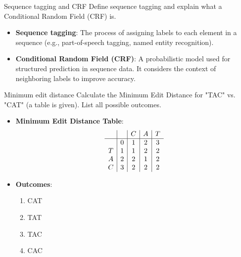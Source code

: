 \documentclass{article}
\begin{document}
\begin{exercise}{Sequence tagging and CRF}
  Define sequence tagging and explain what a Conditional Random Field (CRF) is.

  \begin{solution}
    \begin{itemize}
        \item \textbf{Sequence tagging}: The process of assigning labels to each element in a sequence (e.g., part-of-speech tagging, named entity recognition).
        \item \textbf{Conditional Random Field (CRF)}: A probabilistic model used for structured prediction in sequence data. It considers the context of neighboring labels to improve accuracy.
    \end{itemize}
  \end{solution}
\end{exercise}

\begin{exercise}{Minimum edit distance}
  Calculate the Minimum Edit Distance for "TAC" vs. "CAT" (a table is given). List all possible outcomes.

  \begin{solution}
    \begin{itemize}
        \item \textbf{Minimum Edit Distance Table}:
        \[
        \begin{array}{c|c|c|c|c}
            &  & C & A & T \\
            \hline
            & 0 & 1 & 2 & 3 \\
            T & 1 & 1 & 2 & 2 \\
            A & 2 & 2 & 1 & 2 \\
            C & 3 & 2 & 2 & 2 \\
        \end{array}
        \]
        \item \textbf{Outcomes}:
        \begin{enumerate}
            \item CAT
            \item TAT
            \item TAC
            \item CAC
        \end{enumerate}
    \end{itemize}
  \end{solution}
\end{exercise}
\end{document}
